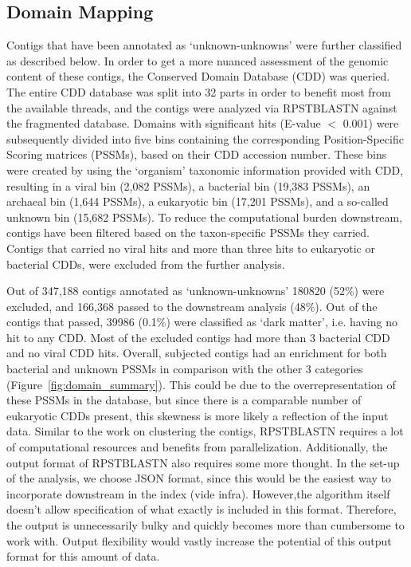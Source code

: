   \subsection{Domain Mapping}
  Contigs that have been annotated as ‘unknown-unknowns’ were further
  classified as described below. In order to get a more nuanced assessment of
  the genomic content of these contigs, the Conserved Domain Database (CDD)
  \cite{Marchler-Bauer2017} was queried. The entire CDD database was split into
  32 parts in order to benefit most from the available threads, and the contigs
  were analyzed via RPSTBLASTN \citep{Camacho2009} against the fragmented
  database. Domains with significant  hits (E-value $<$ 0.001) were subsequently
  divided into five bins containing the corresponding Position-Specific Scoring
  matrices (PSSMs), based on their CDD accession number. These bins were created
  by using the ‘organism’ taxonomic information provided with CDD, resulting in
  a viral bin (2,082 PSSMs), a bacterial bin (19,383 PSSMs), an archaeal bin
  (1,644 PSSMs), a eukaryotic bin (17,201 PSSMs), and a so-called unknown bin
  (15,682 PSSMs). To reduce the computational burden downstream, contigs have
  been filtered based on the taxon-specific PSSMs they carried. Contigs that
  carried no viral hits and more than three hits to eukaryotic or bacterial
  CDDs, were excluded from the  further analysis.

  Out of 347,188 contigs annotated as ‘unknown-unknowns’ 180820 (52\%) were
  excluded, and 166,368 passed to the downstream analysis (48\%). Out of the
  contigs that passed, 39986 (0.1\%) were classified as ‘dark matter’, i.e.
  having no hit to any CDD. Most of the excluded contigs had more than 3
  bacterial CDD and no viral CDD hits. Overall, subjected contigs had an
  enrichment for both bacterial and unknown PSSMs in comparison with the other
  3 categories (Figure~\ref{fig:domain_summary}). This could be due to the
  overrepresentation of these PSSMs in the
  database, but since there is a comparable number of eukaryotic CDDs present,
  this skewness is more likely a reflection of the input data. Similar to the
  work on clustering the contigs, RPSTBLASTN requires a lot of computational
  resources and benefits from parallelization. Additionally, the output format
  of RPSTBLASTN also requires some more thought. In the set-up of the analysis,
  we choose JSON \cite{rfc_json} format, since this would be the easiest way to
  incorporate downstream in the index (vide infra). However,the algorithm
  itself doesn’t allow specification of what exactly is included in this
  format. Therefore, the output is unnecessarily bulky and quickly becomes more
  than cumbersome to work with. Output flexibility would vastly increase the
  potential of this output format for this amount of data.

